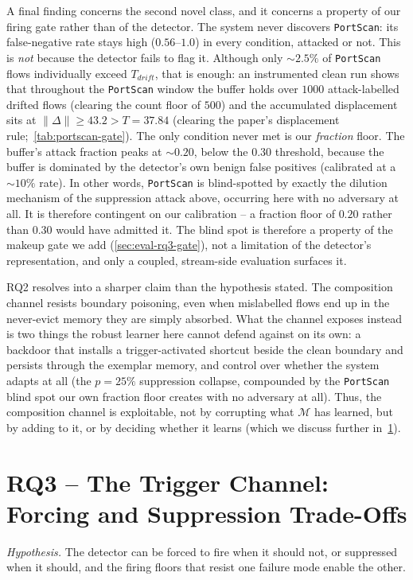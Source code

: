 A final finding concerns the second novel class, and it concerns a property of our firing gate rather than of the detector. The system never discovers \texttt{PortScan}: its false-negative rate stays high ($0.56$--$1.0$) in every condition, attacked or not. This is \emph{not} because the detector fails to flag it. Although only $\sim$$2.5\%$ of \texttt{PortScan} flows individually exceed $T_{drift}$, that is enough: an instrumented clean run shows that throughout the \texttt{PortScan} window the buffer holds over $1000$ attack-labelled drifted flows (clearing the count floor of $500$) and the accumulated displacement sits at $\|\Delta\| \geq 43.2 > T = 37.84$ (clearing the paper's displacement rule;~\cref{tab:portscan-gate}). The only condition never met is our \emph{fraction} floor. The buffer's attack fraction peaks at $\sim$$0.20$, below the $0.30$ threshold, because the buffer is dominated by the detector's own benign false positives (calibrated at a $\sim$$10\%$ rate). In other words, \texttt{PortScan} is blind-spotted by exactly the dilution mechanism of the suppression attack above, occurring here with no adversary at all. It is therefore contingent on our calibration -- a fraction floor of $0.20$ rather than $0.30$ would have admitted it. The blind spot is therefore a property of the makeup gate we add (\cref{sec:eval-rq3-gate}), not a limitation of the detector's representation, and only a coupled, stream-side evaluation surfaces it.



RQ2 resolves into a sharper claim than the hypothesis stated. The composition channel resists boundary poisoning, even when mislabelled flows end up in the never-evict memory they are simply absorbed. What the channel exposes instead is two things the robust learner here cannot defend against on its own: a backdoor that installs a trigger-activated shortcut beside the clean boundary and persists through the exemplar memory, and control over whether the system adapts at all (the $p = 25\%$ suppression collapse, compounded by the \texttt{PortScan} blind spot our own fraction floor creates with no adversary at all). Thus, the composition channel is exploitable, not by corrupting what $\mathcal{M}$ has learned, but by adding to it, or by deciding whether it learns (which we discuss further in~\cref{sec:eval-rq3}).
\clearpage

\section{RQ3 -- The Trigger Channel: Forcing and Suppression Trade-Offs}
\label{sec:eval-rq3}
\textit{Hypothesis.} The detector can be forced to fire when it should not, or suppressed when it should, and the firing floors that resist one failure mode enable the other.

